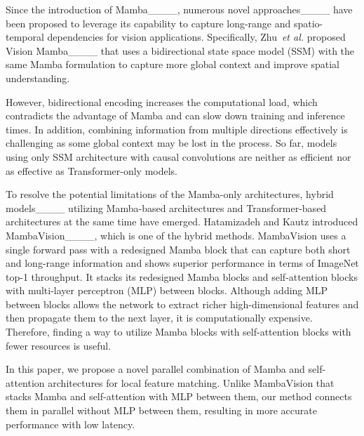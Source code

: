 Since the introduction of Mamba____, numerous novel approaches____ have been proposed to leverage its capability to capture long-range and spatio-temporal dependencies for vision applications. Specifically, Zhu~\textit{et al.} proposed Vision Mamba____ that uses a bidirectional state space model (SSM) with the same Mamba formulation to capture more global context and improve spatial understanding. 

However, bidirectional encoding increases the computational load, which contradicts the advantage of Mamba and can slow down training and inference times. In addition, combining information from multiple directions effectively is challenging as some global context may be lost in the process. So far, models using only SSM architecture with causal convolutions are neither as efficient nor as effective as Transformer-only models. 

To resolve the potential limitations of the Mamba-only architectures, hybrid models____ utilizing Mamba-based architectures and Transformer-based architectures at the same time have emerged. Hatamizadeh and Kautz introduced MambaVision____, which is one of the hybrid methods. MambaVision uses a single forward pass with a redesigned Mamba block that can capture both short and long-range information and shows superior performance in terms of ImageNet top-1 throughput. It stacks its redesigned Mamba blocks and self-attention blocks with multi-layer perceptron (MLP) between blocks. Although adding MLP between blocks allows the network to extract richer high-dimensional features and then propagate them to the next layer, it is computationally expensive. Therefore, finding a way to utilize Mamba blocks with self-attention blocks with fewer resources is useful.

In this paper, we propose a novel parallel combination of Mamba and self-attention architectures for local feature matching. Unlike MambaVision that stacks Mamba and self-attention with MLP between them, our method connects them in parallel without MLP between them, resulting in more accurate performance with low latency.


